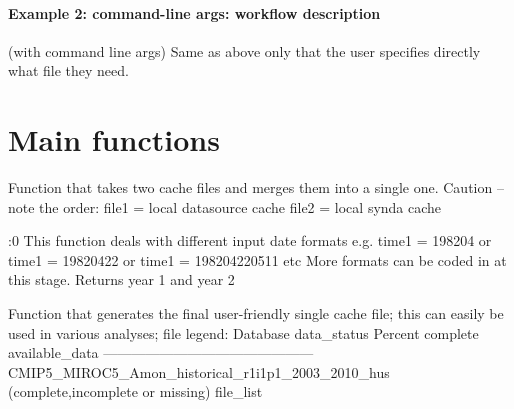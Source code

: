 \documentclass[letterpaper,10pt,english]{sphinxmanual}
\begin{document}
\paragraph{Example 2: command-line args: workflow description}
(with command line args) 
Same as above only that the user specifies directly what file they need.


\section*{Main functions}


\begin{fulllineitems}
\label{\detokenize{index:cmip5datafinder.cache_merge}}
Function that takes two cache files and merges them
into a single one. Caution -- note the order:
file1 = local datasource cache
file2 = local synda cache

\end{fulllineitems}


\begin{fulllineitems}
:0
\label{\detokenize{index:cmip5datafinder.date_handling}}
This function deals with different input date formats e.g.
time1 = 198204 or
time1 = 19820422 or
time1 = 198204220511 etc
More formats can be coded in at this stage.
Returns year 1 and year 2

\end{fulllineitems}


\begin{fulllineitems}
\label{\detokenize{index:cmip5datafinder.final_cache}}
Function that generates the final user-friendly
single cache file; this can easily be used
in various analyses; file legend:
Database \textbar{} data\_status \textbar{} Percent complete \textbar{} available\_data
---------------------------------------------
CMIP5\_MIROC5\_Amon\_historical\_r1i1p1\_2003\_2010\_hus (complete,incomplete or missing) file_list

\end{fulllineitems}
\end{document}
